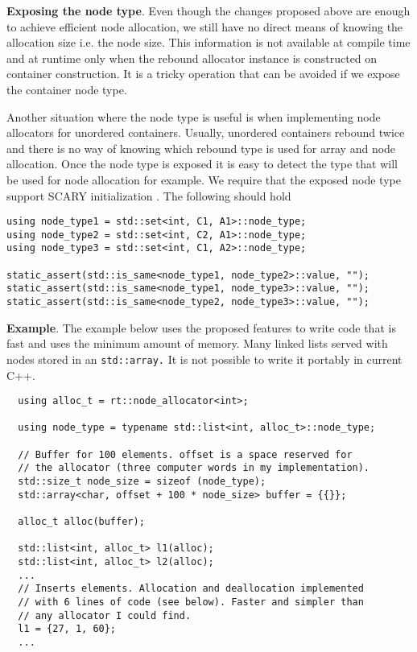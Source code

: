 \documentclass[11pt]{article}
\begin{document}
\medskip
\noindent
{\bf Exposing the node type}. Even though the changes proposed above are enough
to achieve efficient node allocation, we still have no direct means of knowing
the allocation size i.e. the node size. This information is not available at
compile time and at runtime only when the rebound allocator instance is
constructed on container construction. It is a tricky operation that can be
avoided if we expose the container node type.

Another situation where the node type is useful is when implementing node allocators
for unordered containers. Usually, unordered containers rebound twice and there is
no way of knowing which rebound type is used for array and node allocation. Once
the node type is exposed it is easy to detect the type that will be used for node
allocation for example. We require that the exposed node type support SCARY 
initialization \cite{scary}. The following should hold
\medskip
\begin{lstlisting}
using node_type1 = std::set<int, C1, A1>::node_type;
using node_type2 = std::set<int, C2, A1>::node_type;
using node_type3 = std::set<int, C1, A2>::node_type;

static_assert(std::is_same<node_type1, node_type2>::value, "");
static_assert(std::is_same<node_type1, node_type3>::value, "");
static_assert(std::is_same<node_type2, node_type3>::value, "");
\end{lstlisting}

\medskip
\noindent
{\bf Example}. The example below uses the proposed features
to write code that is fast and uses the minimum amount of memory.
Many linked lists served with nodes stored in an \texttt{std::array.}
It is not possible to write it portably in current C++.
\newpage
\medskip
\begin{lstlisting}
  using alloc_t = rt::node_allocator<int>;

  using node_type = typename std::list<int, alloc_t>::node_type;

  // Buffer for 100 elements. offset is a space reserved for
  // the allocator (three computer words in my implementation).
  std::size_t node_size = sizeof (node_type);
  std::array<char, offset + 100 * node_size> buffer = {{}};

  alloc_t alloc(buffer);

  std::list<int, alloc_t> l1(alloc);
  std::list<int, alloc_t> l2(alloc);
  ...
  // Inserts elements. Allocation and deallocation implemented
  // with 6 lines of code (see below). Faster and simpler than
  // any allocator I could find.
  l1 = {27, 1, 60};
  ...
\end{lstlisting}
\end{document}
